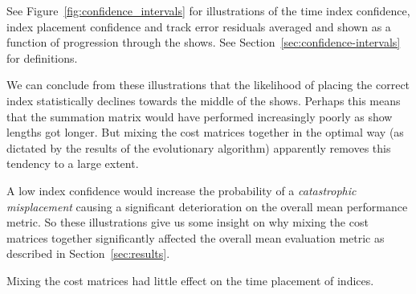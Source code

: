 \documentclass[twocolumn]{article}
\begin{document}
See Figure~\ref{fig:confidence_intervals} for illustrations of the time index confidence, index placement confidence and track error residuals averaged and shown as a function of progression through the shows. See Section~\ref{sec:confidence-intervals} for definitions. 

We can conclude from these illustrations that the likelihood of placing the correct index statistically declines towards the middle of the shows. Perhaps this means that the summation matrix would have performed increasingly poorly as show lengths got longer. But mixing the cost matrices together in the optimal way (as dictated by the results of the evolutionary algorithm) apparently removes this tendency to a large extent. 

A low index confidence would increase the probability of a \textit{catastrophic misplacement} causing a significant deterioration on the overall mean performance metric. So these illustrations give us some insight on why mixing the cost matrices together significantly affected the overall mean evaluation metric as described in Section~\ref{sec:results}.    

Mixing the cost matrices had little effect on the time placement of indices. 
\end{document}
